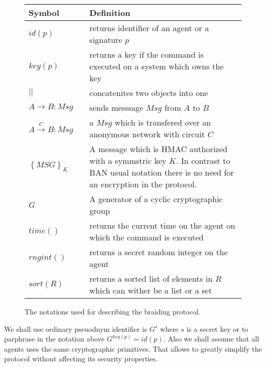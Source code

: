 \documentclass[12pt]{article}
\begin{document}
\begin{figure}[ht]
  \centering
\begin{tabular}{l c p{}}
\toprule
Symbol       &                  & Definition \\
  \midrule
 $id(p)$ & & returns identifier of an agent or a signature $p$ \\
 $key(p)$ & & returns a key if the command is executed on a system which owns the key\\
 $||$ & & concatenites two objects into one\\
 $A \to B: Msg$ & & sends messsage $Msg$ from $A$ to $B$ \\
 $A \overset{C}{\to} B: Msg$ & & a $Msg$ which is transfered over an anonymous network with circuit $C$\\
 $\left\{ MSG \right\}_K$ & & A message which is HMAC authorized with a symmstric key $K$. In contrast to BAN usual notation there is no need for an encryption in the protocol.\\
 $G$ & & A generator of a cyclic cryptographic group\\
 $time()$ & & returns the current time on the agent on which the command is executed\\
 $rngint()$ & & returns a secret random integer on the agent\\
 $sort(R)$ & &returns a sorted list of elements in $R$ which can wither be a list or a set\\
\bottomrule
\end{tabular}
\caption{The notations used for describing the braiding protocol.}
\end{figure}
We shall use ordinary pseuodnym identifier is $G^s$ where $s$ is a secret key or to parphrase in the notation above $G^{key(p)}=id(p)$. Also we shall assume that all agents uses the same cryptographic primitives. That allows to greatly simplify the protocol without affecting its security properties.
\end{document}
